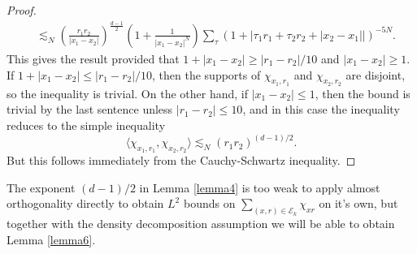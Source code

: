 \begin{proof}
\begin{align*}
        &\lesssim_N \left( \frac{r_1r_2}{|x_1 - x_2|} \right)^{\frac{d-1}{2}} \left(1 + \frac{1}{|x_1 - x_2|^N} \right) \sum\nolimits_\tau \left( 1 + |\tau_1 r_1 + \tau_2 r_2 + |x_2 - x_1|| \right)^{-5N}.
    \end{align*}
    This gives the result provided that $1 + |x_1 - x_2| \geq |r_1 - r_2| / 10$ and $|x_1 - x_2| \geq 1$. If $1 + |x_1 - x_2| \leq |r_1 - r_2| / 10$, then the supports of $\chi_{x_1,r_1}$ and $\chi_{x_2,r_2}$ are disjoint, so the inequality is trivial. On the other hand, if $|x_1 - x_2| \leq 1$, then the bound is trivial by the last sentence unless $|r_1 - r_2| \leq 10$, and in this case the inequality reduces to the simple inequality
    \[ \langle \chi_{x_1,r_1}, \chi_{x_2,r_2} \rangle \lesssim_N (r_1 r_2)^{(d-1)/2}. \] 
    But this follows immediately from the Cauchy-Schwartz inequality.
\end{proof}

The exponent $(d-1)/2$ in Lemma \ref{lemma4} is too weak to apply almost orthogonality directly to obtain $L^2$ bounds on $\sum\nolimits_{(x,r) \in \mathcal{E}_k} \chi_{xr}$ on it's own, but together with the density decomposition assumption we will be able to obtain Lemma \ref{lemma6}.

